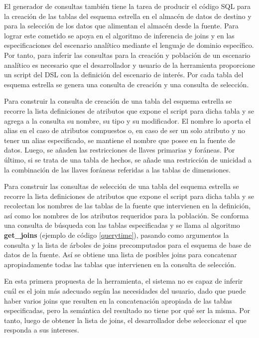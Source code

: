 El generador de consultas también tiene la tarea de producir el código SQL para la creación de las 
tablas del esquema estrella en el almacén de datos de destino y para la selección de 
los datos que alimentan el almacén desde la fuente. Para lograr este cometido se apoya 
en el algoritmo de inferencia de joins y en las especificaciones del escenario analítico 
mediante el lenguaje de dominio específico. Por tanto, para inferir las consultas para 
la creación y población de un escenario analítico es necesario que el desarrollador y 
usuario de la herramienta proporcione un script del DSL con la definición del escenario 
de inter\'es. Por cada tabla del esquema estrella se genera una consulta de creación y una 
consulta de selección.

Para construir la consulta de creación de una tabla del esquema estrella se recorre 
la lista definiciones de atributos que expone el script para dicha tabla y se agrega a la consulta 
su nombre, su tipo y su modificador. 
El nombre lo aporta el alias en el caso de atributos compuestos o, en caso de ser un solo atributo y no tener un alias especificado, 
se mantiene el nombre que posee en la fuente de datos. Luego, se 
añaden las restricciones de llaves primarias y for\'aneas. Por \'ultimo, si se trata de una tabla 
de hechos, se añade una restricción de unicidad a la combinación de las llaves foráneas referidas a las 
tablas de dimensiones.

Para construir las consultas de selección de una tabla del esquema estrella se recorre la 
lista definiciones de atributos que expone el script para dicha tabla y se recolectan los 
nombres de las tablas de la fuente que intervienen en la definición, así como los 
nombres de los atributos requeridos para la población.
Se conforma una consulta de b\'usqueda con las tablas especificadas y se llama al algoritmo \textbf{get\_joins} (ejemplo de c\'odigo \ref{querytime}),
pasando como argumentos la consulta y la lista de \'arboles de joins precomputados para el esquema 
de base de datos de la fuente. As\'i se obtiene una lista de posibles joins para concatenar apropiadamente todas las 
tablas que intervienen en la consulta de selección.

En esta primera propuesta de la herramienta, el sistema no es capaz de inferir cu\'al es el join 
m\'as adecuado según las necesidades del usuario, dado que puede haber varios joins que resulten 
en la concatenación apropiada de las tablas especificadas, pero la semántica del resultado no tiene por qu\'e ser 
la misma. Por tanto, luego de obtener la lista de joins, el desarrollador debe seleccionar el que responda 
a sus intereses.

